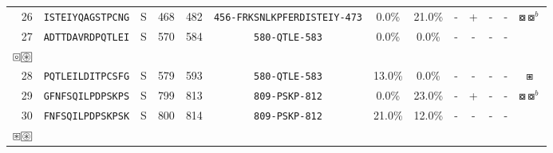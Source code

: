 \begin{tabular}{rcccccccccccc}
26 &  \texttt{ISTEIYQAGSTPCNG} &       S &    468 &   482 &  \texttt{{\scriptsize 456-}FRKSNLKPFERDISTEIY{\scriptsize -473}} &                           0.0\% &                           21.0\% &          - &           + &          - &           - &                                                                                                           $ \boxcircle \boxcircle^b $ \\
27 &  \texttt{ADTTDAVRDPQTLEI} &       S &    570 &   584 &                \texttt{{\scriptsize 580-}QTLE{\scriptsize -583}} &                           0.0\% &                            0.0\% &          - &           - &          - &           - &  \Centerstack{  $\boxempty \boxempty^d \boxempty^b \boxempty^{bd}$ \\  $\boxcircle \setlength{\fboxsep}{0.5pt} \boxed{\circledast}$ } \\
28 &  \texttt{PQTLEILDITPCSFG} &       S &    579 &   593 &                \texttt{{\scriptsize 580-}QTLE{\scriptsize -583}} &                          13.0\% &                            0.0\% &          - &           - &          - &           - &                                                                                                                           $ \boxast $ \\
29 &  \texttt{GFNFSQILPDPSKPS} &       S &    799 &   813 &                \texttt{{\scriptsize 809-}PSKP{\scriptsize -812}} &                           0.0\% &                           23.0\% &          - &           + &          - &           - &                                                                                                           $ \boxcircle \boxcircle^b $ \\
30 &  \texttt{FNFSQILPDPSKPSK} &       S &    800 &   814 &                \texttt{{\scriptsize 809-}PSKP{\scriptsize -812}} &                          21.0\% &                           12.0\% &          - &           - &          - &           - &     \Centerstack{  $\boxempty \boxempty^d \boxempty^b \boxempty^{bd}$ \\  $\boxast \setlength{\fboxsep}{0.5pt} \boxed{\circledast}$ } \\
\bottomrule
\end{tabular}
